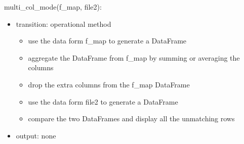 \documentclass[12pt]{article}
\begin{document}
\noindent multi\_col\_mode(f\_map, file2):
\begin{itemize}
  \item transition: operational method 
  \begin{itemize}[\null]
    \item use the data form f\_map to generate a DataFrame
    \item aggregate the DataFrame from f\_map by summing or averaging the columns
    \item drop the extra columns from the f\_map DataFrame
    \item use the data form file2 to generate a DataFrame
    \item compare the two DataFrames and display all the unmatching rows
  \end{itemize}
  \item output: none
\end{itemize}
\end{document}
